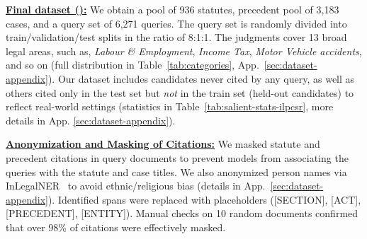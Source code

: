 \vspace{1mm}
\noindent\underline{\textbf{Final dataset (\ilpcsr{}):}}
We obtain a pool of 936 statutes, precedent pool of 3,183 cases, and a query set of 6,271 queries. The query set is randomly divided into train/validation/test splits in the ratio of 8:1:1.
The judgments cover 13 broad legal areas, such as, \textit{Labour \& Employment}, \textit{Income Tax}, \textit{Motor Vehicle accidents}, and so on (full distribution in Table~\ref{tab:categories}, App.~\ref{sec:dataset-appendix}).
Our dataset includes candidates never cited by any query, as well as others cited only in the test set but \textit{not} in the train set (held-out candidates) to reflect real-world settings (statistics in Table~\ref{tab:salient-stats-ilpcsr}, more details in App. \ref{sec:dataset-appendix}).

\vspace{1mm}
\noindent\underline{\textbf{Anonymization and Masking of Citations:}} 
We masked statute and precedent citations in query documents to prevent models from associating the queries with the statute and case titles.
We also anonymized person names via InLegalNER~\citep{kalamkar2022legalner} to avoid ethnic/religious bias (details in App.~\ref{sec:dataset-appendix}). Identified spans were replaced with placeholders ([SECTION], [ACT], [PRECEDENT], [ENTITY]). Manual checks on 10 random documents confirmed that over 98\% of citations were effectively masked.




